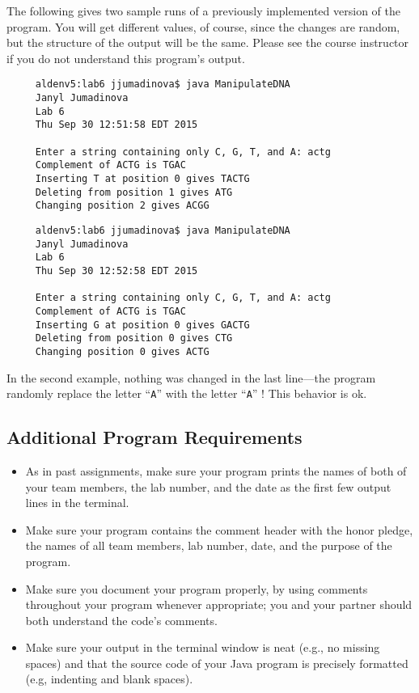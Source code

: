 The following gives two sample runs of a previously implemented version of the program. You will get different values, of course, since the
changes are random, but the structure of the output will be the same. Please see the course instructor if you do not
understand this program's output.

\begin{verbatim}
     aldenv5:lab6 jjumadinova$ java ManipulateDNA
     Janyl Jumadinova
     Lab 6
     Thu Sep 30 12:51:58 EDT 2015

     Enter a string containing only C, G, T, and A: actg
     Complement of ACTG is TGAC
     Inserting T at position 0 gives TACTG
     Deleting from position 1 gives ATG
     Changing position 2 gives ACGG
\end{verbatim}

\begin{verbatim}
     aldenv5:lab6 jjumadinova$ java ManipulateDNA
     Janyl Jumadinova
     Lab 6
     Thu Sep 30 12:52:58 EDT 2015

     Enter a string containing only C, G, T, and A: actg
     Complement of ACTG is TGAC
     Inserting G at position 0 gives GACTG
     Deleting from position 0 gives CTG
     Changing position 0 gives ACTG
\end{verbatim}

In the second example, nothing was changed in the last line---the program
randomly replace the letter ``{\tt A}'' with the letter ``{\tt A}'' !
This behavior is ok.

\vspace{-0.05in}
\subsection*{Additional Program Requirements}
\vspace{-0.05in}
\begin{itemize}

\item As in past assignments, make sure your program prints the names of both of your team members, the lab number, and
  the date as the first few output lines in the terminal.

\item Make sure your program contains the comment header with the honor pledge, the names of all team members, lab
  number, date, and the purpose of the program.

\item Make sure you document your program properly, by using comments throughout your program whenever appropriate; you
  and your partner should both understand the code's comments.

\item Make sure your output in the terminal window is neat (e.g., no missing spaces) and that the source code of your
  Java program is precisely formatted (e.g, indenting and blank spaces).

\end{itemize}

